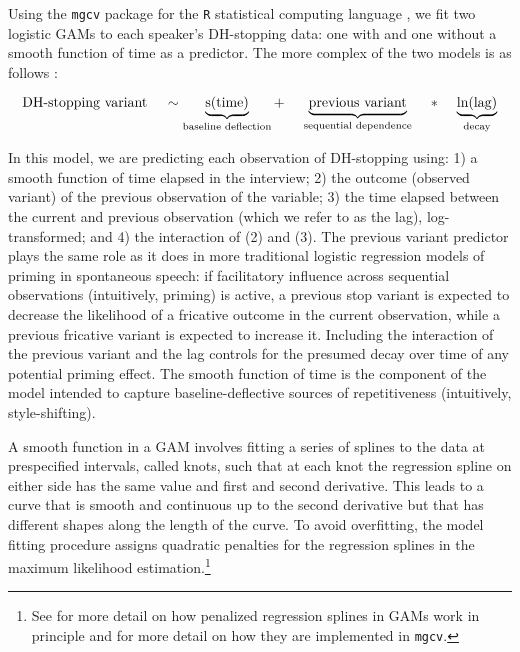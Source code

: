 \documentclass[12pt]{article}
\begin{document}
Using the \texttt{mgcv} package for the \texttt{R} statistical computing language \citep{R2015,wood2016}, we fit two logistic GAMs to each speaker's DH-stopping data: one with and one without a smooth function of time as a predictor. The more complex of the two models is as follows :
  
\begin{equation} \label{spline-mod}
  \text{DH-stopping variant} \hspace{12pt} \sim
  \underbrace{\text{s(time)}}_{\substack{\text{baseline deflection}}} 
  + \hspace{12pt} 
  \underbrace{\text{previous variant}}_{\text{sequential dependence}} \hspace{12pt} 
  * \hspace{12pt} 
  \underbrace{\text{ln(lag)}}_{\text{decay}}
  \vspace{12pt}
\end{equation}

In this model, we are predicting each observation of DH-stopping using: 1) a smooth function of time elapsed in the interview; 2) the outcome (observed variant) of the previous observation of the variable; 3) the time elapsed between the current and previous observation (which we refer to as the lag), log-transformed; and 4) the interaction of (2) and (3). The previous variant predictor plays the same role as it does in more traditional logistic regression models of priming in spontaneous speech: if facilitatory influence across sequential observations (intuitively, priming) is active, a previous stop variant is expected to decrease the likelihood of a fricative outcome in the current observation, while a previous fricative variant is expected to increase it. Including the interaction of the previous variant and the lag controls for the presumed decay over time of any potential priming effect. The smooth function of time is the component of the model  intended to capture baseline-deflective sources of repetitiveness (intuitively, style-shifting).


A smooth function in a GAM involves fitting a series of splines to the data at prespecified intervals, called knots, such that at each knot the regression spline on either side has the same value and first and second derivative. This leads to a curve that is smooth and continuous up to the second derivative but that has different shapes along the length of the curve. To avoid overfitting, the model fitting procedure assigns quadratic penalties for the regression splines in the maximum likelihood estimation.\footnote{See \cite{wood2006} for more detail on how penalized regression splines in GAMs work in principle and \cite{wood2016} for more detail on how they are implemented in \texttt{mgcv}.} 
\end{document}
